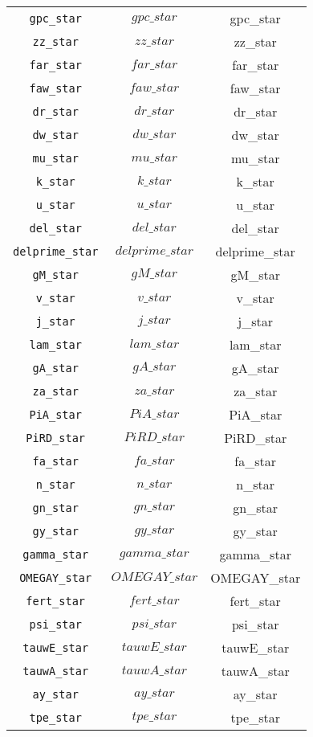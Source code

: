 \begin{center}
\begin{longtable}{ccc}
\texttt{gpc\_star} & $gpc\_star$ & gpc\_star\\
\texttt{zz\_star} & $zz\_star$ & zz\_star\\
\texttt{far\_star} & $far\_star$ & far\_star\\
\texttt{faw\_star} & $faw\_star$ & faw\_star\\
\texttt{dr\_star} & $dr\_star$ & dr\_star\\
\texttt{dw\_star} & $dw\_star$ & dw\_star\\
\texttt{mu\_star} & $mu\_star$ & mu\_star\\
\texttt{k\_star} & $k\_star$ & k\_star\\
\texttt{u\_star} & $u\_star$ & u\_star\\
\texttt{del\_star} & $del\_star$ & del\_star\\
\texttt{delprime\_star} & $delprime\_star$ & delprime\_star\\
\texttt{gM\_star} & $gM\_star$ & gM\_star\\
\texttt{v\_star} & $v\_star$ & v\_star\\
\texttt{j\_star} & $j\_star$ & j\_star\\
\texttt{lam\_star} & $lam\_star$ & lam\_star\\
\texttt{gA\_star} & $gA\_star$ & gA\_star\\
\texttt{za\_star} & $za\_star$ & za\_star\\
\texttt{PiA\_star} & $PiA\_star$ & PiA\_star\\
\texttt{PiRD\_star} & $PiRD\_star$ & PiRD\_star\\
\texttt{fa\_star} & $fa\_star$ & fa\_star\\
\texttt{n\_star} & $n\_star$ & n\_star\\
\texttt{gn\_star} & $gn\_star$ & gn\_star\\
\texttt{gy\_star} & $gy\_star$ & gy\_star\\
\texttt{gamma\_star} & $gamma\_star$ & gamma\_star\\
\texttt{OMEGAY\_star} & $OMEGAY\_star$ & OMEGAY\_star\\
\texttt{fert\_star} & $fert\_star$ & fert\_star\\
\texttt{psi\_star} & $psi\_star$ & psi\_star\\
\texttt{tauwE\_star} & $tauwE\_star$ & tauwE\_star\\
\texttt{tauwA\_star} & $tauwA\_star$ & tauwA\_star\\
\texttt{ay\_star} & $ay\_star$ & ay\_star\\
\texttt{tpe\_star} & $tpe\_star$ & tpe\_star\\

\end{longtable}
\end{center}
